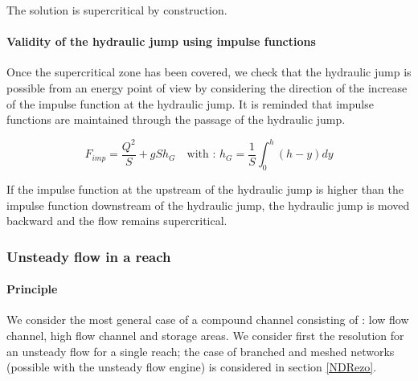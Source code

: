 \vspace{0.5cm}

The solution is supercritical by construction.


\paragraph{Validity of the hydraulic jump using impulse functions\\}

\hspace*{1cm}

Once the supercritical zone has been covered, we check that the hydraulic jump is possible from an energy point of view by considering the direction of the increase of the impulse function at the hydraulic jump. It is reminded that impulse functions are maintained through the passage of the hydraulic jump.

\begin{equation}
F_{imp} = \frac{Q^2}{S}+gSh_G \quad \mbox{with : }h_G=\frac{1}{S}\int_0^h(h-y)dy
\end{equation}

\vspace{0.5cm}

If the impulse function at the upstream of the hydraulic jump is higher than the impulse function downstream of the hydraulic jump, the hydraulic jump is moved backward and the flow remains supercritical.


\subsubsection{Unsteady flow in a reach}

\paragraph{Principle\\}

\hspace*{1cm}

We consider the most general case of a compound channel consisting of : low flow channel, high flow channel and storage areas. We consider first the resolution for an unsteady flow for a single reach; the case of branched and meshed networks (possible with the unsteady flow engine) is considered in section \ref{NDRezo}.

\vspace{0.5cm}

